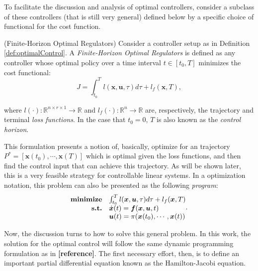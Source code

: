 \documentclass[a4paper,11pt]{book}
\numberwithin{figure}{chapter}
\numberwithin{equation}{chapter}
\numberwithin{table}{chapter}
\theoremstyle{definition}
\newtheorem{definition}{Definition}[chapter]
\newcounter{boxed-theorem}
\newcounter{boxed-definition}
\newenvironment{boxed-definition}[1]
{\begin{shaded} \begin{definition}{#1}}
{\end{definition} \end{shaded}}
\begin{document}
To facilitate the discussion and analysis of optimal controllers, consider a subclass of these controllers (that is still very general) defined below by a specific choice of functional for the cost function.

\begin{boxed-definition}{(Finite-Horizon Optimal Regulators)} \label{def:finiteHorizonOC}
    Consider a controller setup as in Definition \ref{def:optimalControl}. A \textit{Finite-Horizon Optimal Regulators} is defined as any controller whose optimal policy over a time interval $t \in [t_0, T]$ minimizes the cost functional:
    \begin{equation}
        J = \int_{t_0}^T l(\bm{x}, \bm{u}, \tau) d \tau + l_f(\bm{x}, T)
    ,\end{equation}
    
    \noindent where $l(\cdot) : \mathbb{R}^{n \times r \times 1} \rightarrow \mathbb{R}$ and $l_f(\cdot) : \mathbb{R}^{n} \rightarrow \mathbb{R}$ are, respectively, the trajectory and terminal \textit{loss functions}. In the case that $t_0 = 0$, $T$ is also known as the \textit{control horizon}.
\end{boxed-definition}

This formulation presents a notion of, basically, optimize for an trajectory $P^* = [\bm{x}(t_0), \cdots, \bm{x}(T)]$ which is optimal given the loss functions, and then find the control input that can achieve this trajectory. As will be shown later, this is a very feasible strategy for controllable linear systems. In a optimization notation, this problem can also be presented as the following \textit{program}: 
\begin{align}
\begin{matrix*}[l]
    \textbf{minimize} & \int_{t_0}^T l(\bm{x}, \bm{u}, \tau) d \tau + l_f(\bm{x}, T) \\
    \hfill \textbf{s.t.} & \dot{\bm{x}}(t) = \bm{f}(\bm{x}, \bm{u}, t)  \\
                & \bm{u}(t) = \pi(\bm{x}(t_0), \cdots, \bm{x}(t))
\end{matrix*}
.\end{align}

Now, the discussion turns to how to solve this general problem. In this work, the solution for the optimal control will follow the same dynamic programming formulation as in \textbf{[reference]}. The first necessary effort, then, is to define an important partial differential equation known as the Hamilton-Jacobi equation.
\end{document}
